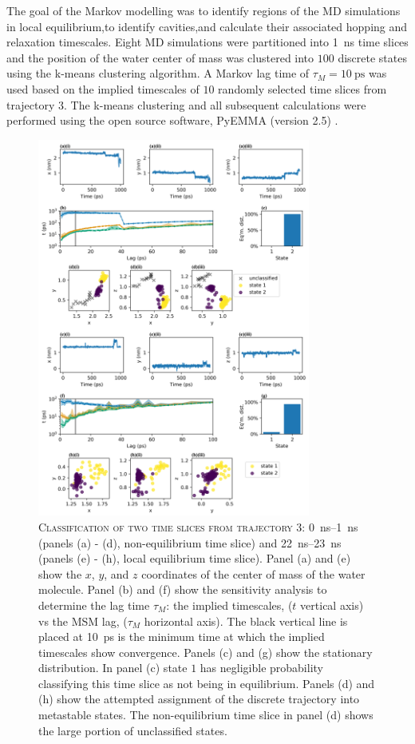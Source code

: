 The goal of the Markov modelling was to identify regions of the MD simulations in local equilibrium,to identify cavities,and calculate their associated hopping and relaxation timescales. Eight MD simulations were partitioned into \SI{1}{\nano\second} time slices and the position of the water center of mass was clustered into $100$ discrete states using the k-means \cite{lloydLeastSquaresQuantization1982} clustering algorithm. A Markov lag time of $\tau_{M} = \SI{10}{\pico\second}$ was used based on the implied timescales of $10$ randomly selected time slices from trajectory \num{3}.  The k-means clustering and all subsequent calculations were performed using the open source software, PyEMMA (version 2.5) \cite{schererPyEMMASoftwarePackage2015a}. 

\begin{figure}[p]
    \centering
    \caption[Classification of two time slices from trajectory 3]{\textsc{Classification of two time slices from trajectory 3}: \SIrange{0}{1}{\nano\second} (panels (a) - (d), non-equilibrium time slice) and \SIrange{22}{23}{\nano\second} (panels (e) - (h), local equilibrium time slice). Panel (a) and (e) show the $x$, $y$, and $z$ coordinates of the center of mass of the water molecule. Panel (b) and (f) show the sensitivity analysis to determine the lag time $\tau_{M}$: the implied timescales, ($t$ vertical axis) vs the MSM lag, ($\tau_{M}$ horizontal axis). The black vertical line is placed at \SI{10}{\pico\second} is the minimum time at which the implied timescales show convergence. Panels (c) and (g) show the stationary distribution. In panel (c) state $1$ has negligible probability classifying this time slice as not being in equilibrium. Panels (d) and (h) show the attempted assignment of the discrete trajectory into metastable states. The non-equilibrium time slice in panel (d) shows the large portion of unclassified states.}
    \includegraphics[width=0.8\textwidth]{chapters/water_hopping/figures/Fig_S11.png}

\end{figure}
